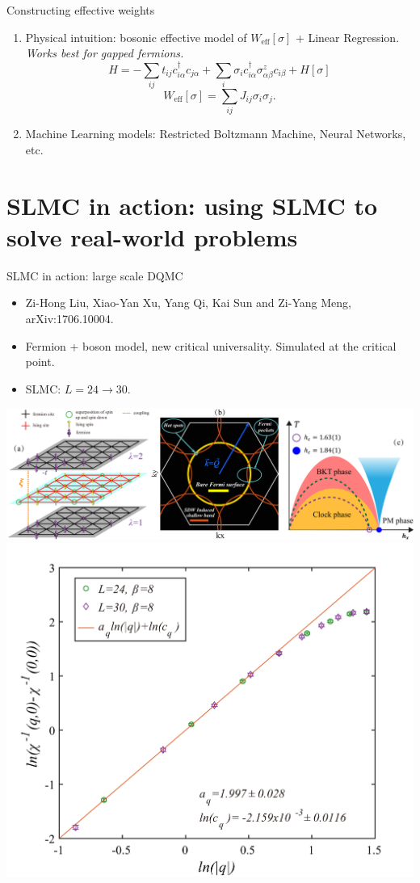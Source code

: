 \documentclass[xcolor=table, 10pt, aspectratio=169]{beamer}
\begin{document}
\begin{frame}{Constructing effective weights}
\begin{enumerate}
  \item Physical intuition: bosonic effective model of $W_{\text{eff}}[\sigma]$
  + Linear Regression.\\
  \emph{Works best for gapped fermions.}
  \[H=-\sum_{ij}t_{ij}c_{i\alpha}^\dagger c_{j\alpha}
  +\sum_i\sigma_ic_{i\alpha}^\dagger\sigma^z_{\alpha\beta} c_{i\beta}
  +H[\sigma]\]
  \[W_{\text{eff}}[\sigma]=\sum_{ij}J_{ij}\sigma_i\sigma_j.\]
  \item Machine Learning models: Restricted Boltzmann Machine, Neural Networks, etc.
\end{enumerate}
\end{frame}

\section{SLMC in action: using SLMC to solve real-world problems}

\begin{frame}{SLMC in action: large scale DQMC}
\begin{itemize}
  \item Zi-Hong Liu, Xiao-Yan Xu, Yang Qi, Kai Sun and Zi-Yang Meng, arXiv:1706.10004.
  \item Fermion + boson model, new critical universality. Simulated at the critical point.
  \item SLMC: $L=24\rightarrow30$.
\end{itemize}
\begin{center}
  \includegraphics[width=.6\textwidth]{combine}
  \includegraphics[width=.4\textwidth]{chi-q-fit}
\end{center}
\end{frame}
\end{document}
